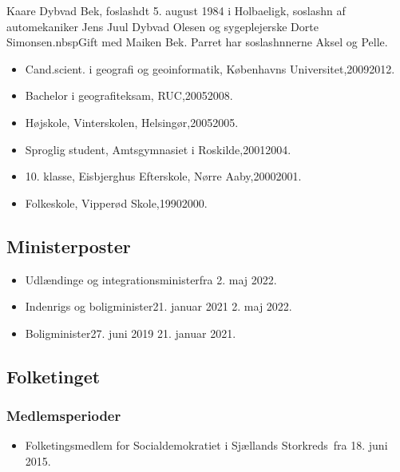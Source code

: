 \documentclass[11pt, a4paper]{awesome-cv}
\begin{document}
\makecvheader[R]
\makelettertitle
\begin{cvletter}
Kaare Dybvad Bek, foslashdt 5. august 1984 i Holbaeligk, soslashn af automekaniker Jens Juul Dybvad Olesen og sygeplejerske Dorte Simonsen.nbspGift med Maiken Bek. Parret har soslashnnerne Aksel og Pelle.

\begin{itemize}
\item Cand.scient. i geografi og geoinformatik, Københavns Universitet,20092012.
\item Bachelor i geografiteksam, RUC,20052008.
\item Højskole, Vinterskolen, Helsingør,20052005.
\item Sproglig student, Amtsgymnasiet i Roskilde,20012004.
\item 10. klasse, Eisbjerghus Efterskole, Nørre Aaby,20002001.
\item Folkeskole, Vipperød Skole,19902000.
\end{itemize}
\subsection*{Ministerposter}
\begin{itemize}
\item Udlændinge og integrationsministerfra 2. maj 2022.
\item Indenrigs og boligminister21. januar 2021  2. maj 2022.
\item Boligminister27. juni 2019  21. januar 2021.
\end{itemize}
\subsection*{Folketinget}
\subsubsection*{Medlemsperioder}
\begin{itemize}
\item Folketingsmedlem for Socialdemokratiet i Sjællands Storkreds fra 18. juni 2015.
\end{itemize}

\end{cvletter}
\end{document}
